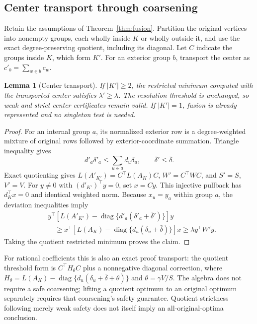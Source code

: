 \documentclass[sigconf,anonymous,review]{acmart}
\newtheorem{lemma}{Lemma}
\newcommand{\1}{\mathbf{1}}
\newcommand{\diag}{\operatorname{diag}}
\begin{document}
\subsection{Center transport through coarsening}\label{app:transport}
Retain the assumptions of Theorem~\ref{thm:fusion}. Partition the original
vertices into nonempty groups, each wholly inside $K$ or wholly outside it,
and use the exact degree-preserving quotient, including its diagonal.
Let $C$ indicate the groups inside $K$, which form $K'$.
For an exterior group $b$, transport the center as
$c'_b=\sum_{w\in b}c_w$.

\begin{lemma}[Center transport]\label{lem:transport}
If $|K'|\ge2$, the restricted minimum computed with the transported center
satisfies $\lambda'\ge\lambda$. The resolution threshold is unchanged, so
weak and strict center certificates remain valid. If $|K'|=1$, fusion is
already represented and no singleton test is needed.
\end{lemma}
\begin{proof}
For an internal group $a$, its normalized exterior row is a degree-weighted
mixture of original rows followed by exterior-coordinate summation. Triangle
inequality gives
\[
 d'_a\delta'_a\le\sum_{u\in a}d_u\delta_u,
 \qquad \bar\delta'\le\bar\delta.
\]
Exact quotienting gives $L(A'_{K'})=C^\top L(A_K)C$,
$W'=C^\top WC$, and $S'=S$, $V'=V$.
For $y\ne0$ with $(d'_{K'})^\top y=0$, set $x=Cy$.
This injective pullback has $d_K^\top x=0$ and identical weighted norm.
Because $x_u=y_a$ within group $a$, the deviation inequalities imply
\begin{align*}
 &y^\top[L(A'_{K'})-\diag\{d'_a(\delta'_a+\bar\delta')\}]y\\
 &\quad\ge x^\top[L(A_K)-\diag\{d_u(\delta_u+\bar\delta)\}]x
 \ge\lambda y^\top W'y.
\end{align*}
Taking the quotient restricted minimum proves the claim.
\end{proof}
For rational coefficients this is also an exact proof transport: the quotient
threshold form is $C^\top H_\theta C$ plus a nonnegative diagonal correction,
where $H_\theta=L(A_K)-\diag\{d_u(\delta_u+\bar\delta+\theta)\}$ and
$\theta=\gamma V/S$.
The algebra does not require a safe coarsening; lifting a quotient optimum to
an original optimum separately requires that coarsening's safety guarantee.
Quotient strictness following merely weak safety does not itself imply an
all-original-optima conclusion.
\end{document}
